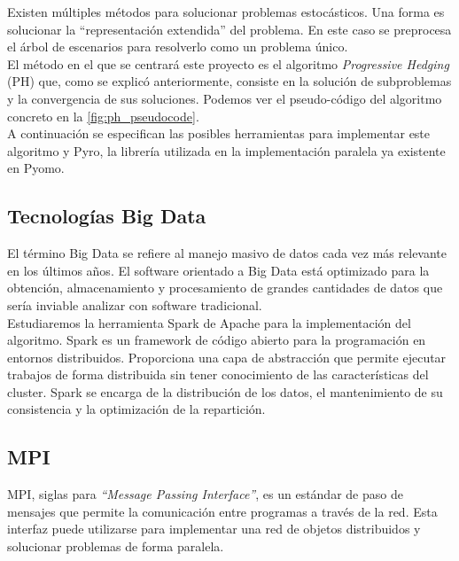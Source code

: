 
Existen múltiples métodos para solucionar problemas estocásticos. Una forma es solucionar la ``representación extendida'' del problema. En este caso se preprocesa el árbol de escenarios para resolverlo como un problema único.\\

El método en el que se centrará este proyecto es el algoritmo \textit{Progressive Hedging} (PH) que, como se explicó anteriormente, consiste en la solución de subproblemas y la convergencia de sus soluciones. Podemos ver el pseudo-código del algoritmo concreto en la \autoref{fig:ph_pseudocode}.\\

A continuación se especifican las posibles herramientas para implementar este algoritmo y Pyro, la librería utilizada en la implementación paralela ya existente en Pyomo.

\subsection{Tecnologías Big Data}

El término Big Data se refiere al manejo masivo de datos cada vez más relevante en los últimos años. El software orientado a Big Data está optimizado para la obtención, almacenamiento y procesamiento de grandes cantidades de datos que sería inviable analizar con software tradicional. \\

Estudiaremos la herramienta Spark \cite{spark} de Apache para la implementación del algoritmo. Spark es un framework de código abierto para la programación en entornos distribuidos. Proporciona una capa de abstracción que permite ejecutar trabajos de forma distribuida sin tener conocimiento de las características del cluster. Spark se encarga de la distribución de los datos, el mantenimiento de su consistencia y la optimización de la repartición.\\

\subsection{MPI}
 MPI, siglas para \textit{``Message Passing Interface''}, es un estándar de paso de mensajes que permite la comunicación entre programas a través de la red. Esta interfaz puede utilizarse para implementar una red de objetos distribuidos y solucionar problemas de forma paralela.\\

